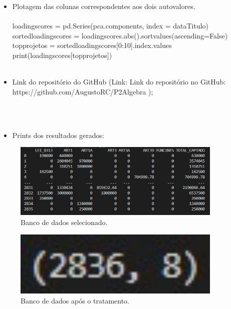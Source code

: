 \documentclass{article}
\begin{document}
\begin{itemize}
\item Plotagem das colunas correspondentes aos dois autovalores.\\ \\
loading\textunderscore scores = pd.Series(pca.components\textunderscore[0], index = dataTitulo)\\
sorted\textunderscore loading\textunderscore scores = loading\textunderscore scores.abs().sort\textunderscore values(ascending=False)\\
top\textunderscore projetos = sorted\textunderscore loading\textunderscore scores[0:10].index.values\\
print(loading\textunderscore scores[top\textunderscore projetos])\\ \\
\end{itemize} 
\begin{itemize}
    \item Link do repositório do GitHub
    \newline(Link:
    Link do repositório no GitHub: https://github.com/AugustoRC/P2Algebra
);
\end{itemize}\\ \\

\begin{itemize}

\item Prints dos resultados gerados:
\end{itemize}

\begin{figure}[!h]
\centering
\includegraphics[width=10cm]{banco de dados int.jpg}
\caption{Banco de dados selecionado.}
\label{fig:banco de dados int.jpg}
\end{figure}

\begin{figure}[!h]
\centering
\includegraphics[width=10cm]{banco de dados tratado.jpg}
\caption{Banco de dados após o tratamento.}
\label{fig:banco de dados tratado.jpg}
\end{figure}
\end{document}
